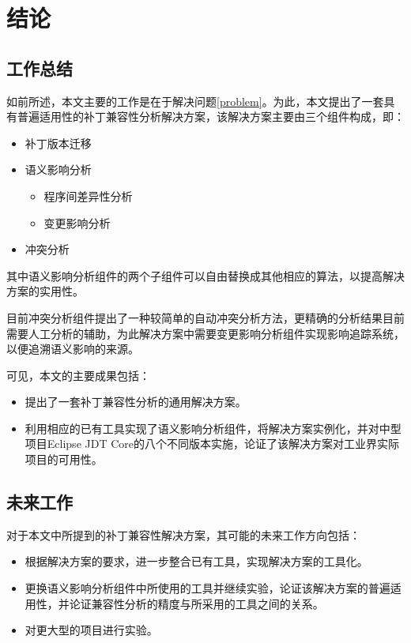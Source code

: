 \chapter{结论}
\section{工作总结}

如前所述，本文主要的工作是在于解决问题\ref {problem}。为此，本文提出了一套具有普遍适用性的补丁兼容性分析解决方案，该解决方案主要由三个组件构成，即：
\begin{itemize}
	\item 补丁版本迁移
	\item 语义影响分析
	\begin{itemize}
		\item 程序间差异性分析
		\item 变更影响分析
	\end{itemize}
	\item 冲突分析
\end{itemize}

其中语义影响分析组件的两个子组件可以自由替换成其他相应的算法，以提高解决方案的实用性。

目前冲突分析组件提出了一种较简单的自动冲突分析方法，更精确的分析结果目前需要人工分析的辅助，为此解决方案中需要变更影响分析组件实现影响追踪系统，以便追溯语义影响的来源。

可见，本文的主要成果包括：
\begin{itemize}
	\item 提出了一套补丁兼容性分析的通用解决方案。
	\item 利用相应的已有工具实现了语义影响分析组件，将解决方案实例化，并对中型项目Eclipse JDT Core的八个不同版本实施，论证了该解决方案对工业界实际项目的可用性。
\end{itemize}

\section{未来工作}

对于本文中所提到的补丁兼容性解决方案，其可能的未来工作方向包括：
\begin{itemize}
	\item 根据解决方案的要求，进一步整合已有工具，实现解决方案的工具化。
	\item 更换语义影响分析组件中所使用的工具并继续实验，论证该解决方案的普遍适用性，并论证兼容性分析的精度与所采用的工具之间的关系。
	\item 对更大型的项目进行实验。
\end{itemize}